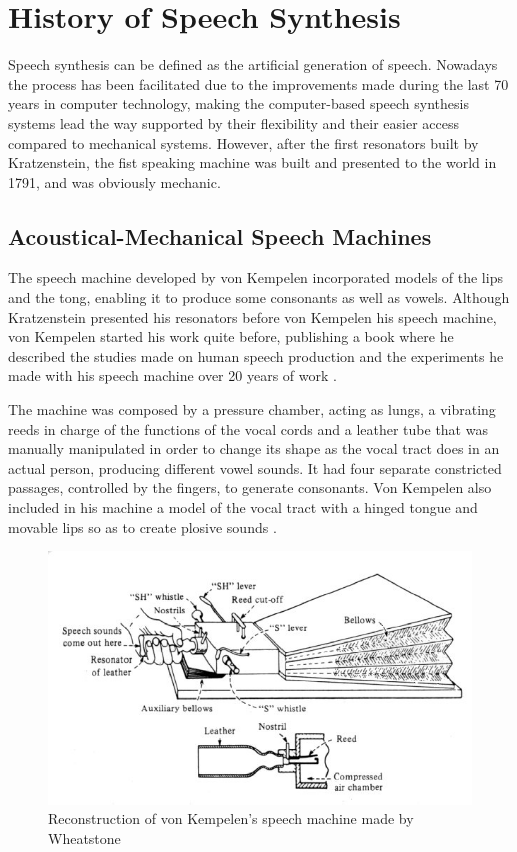 \section{History of Speech Synthesis}
\label{history_speech_synthesis}
Speech synthesis can be defined as the artificial generation of speech. Nowadays the process has been facilitated due to the improvements made during the last 70 years in computer technology, making the computer-based speech synthesis systems lead the way supported by their flexibility and their easier access compared to mechanical systems. However, after the first resonators built by Kratzenstein, the fist speaking machine was built and presented to the world in 1791, and was obviously mechanic.

\subsection{Acoustical-Mechanical Speech Machines}
\label{history_mechanical_machines}
The speech machine developed by von Kempelen incorporated models of the lips and the tong, enabling it to produce some consonants as well as vowels. Although Kratzenstein presented his resonators before von Kempelen his speech machine, von Kempelen started his work quite before, publishing a book where he described the studies made on human speech production and the experiments he made with his speech machine over 20 years of work \cite{vonKempelen}.  

The machine was composed by a pressure chamber, acting as lungs, a vibrating reeds in charge of the functions of the vocal cords and a leather tube that was manually manipulated in order to change its shape as the vocal tract does in an actual person, producing different vowel sounds. It had four separate constricted passages, controlled by the fingers, to generate consonants. Von Kempelen also included in his machine a model of the vocal tract with a hinged tongue and movable lips so as to create plosive sounds \cite{Schroeder93, LemmettyMSc, flanagan_1973_speech}. 

\begin{figure}[htb]
	\begin{center}
		\includegraphics[width=\textwidth]{images/von_kempelen_machine.jpg}
		\caption{Reconstruction of von Kempelen's speech machine made by Wheatstone \cite{flanagan_book}}
		\label{fig:speech_machine}
	\end{center}
\end{figure}

